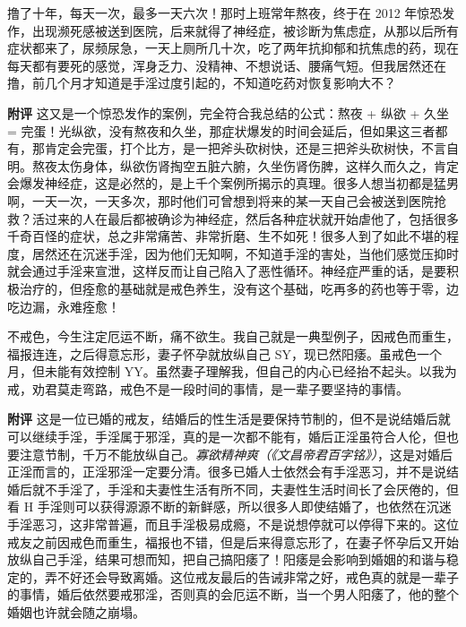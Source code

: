 \begin{case}
    撸了十年，每天一次，最多一天六次！那时上班常年熬夜，终于在 2012 年惊恐发作，出现濒死感被送到医院，后来就得了神经症，被诊断为焦虑症，从那以后所有症状都来了，尿频尿急，一天上厕所几十次，吃了两年抗抑郁和抗焦虑的药，现在每天都有要死的感觉，浑身乏力、没精神、不想说话、腰痛气短。但我居然还在撸，前几个月才知道是手淫过度引起的，不知道吃药对恢复影响大不？

    \textbf{附评} 这又是一个惊恐发作的案例，完全符合我总结的公式：熬夜 + 纵欲 + 久坐 = 完蛋！光纵欲，没有熬夜和久坐，那症状爆发的时间会延后，但如果这三者都有，那肯定会完蛋，打个比方，是一把斧头砍树快，还是三把斧头砍树快，不言自明。熬夜太伤身体，纵欲伤肾掏空五脏六腑，久坐伤肾伤脾，这样久而久之，肯定会爆发神经症，这是必然的，是上千个案例所揭示的真理。很多人想当初都是猛男啊，一天一次，一天多次，那时他们可曾想到将来的某一天自己会被送到医院抢救？活过来的人在最后都被确诊为神经症，然后各种症状就开始虐他了，包括很多千奇百怪的症状，总之非常痛苦、非常折磨、生不如死！很多人到了如此不堪的程度，居然还在沉迷手淫，因为他们无知啊，不知道手淫的害处，当他们感觉压抑时就会通过手淫来宣泄，这样反而让自己陷入了恶性循环。神经症严重的话，是要积极治疗的，但痊愈的基础就是戒色养生，没有这个基础，吃再多的药也等于零，边吃边漏，永难痊愈！
\end{case}

\begin{case}
    不戒色，今生注定厄运不断，痛不欲生。我自己就是一典型例子，因戒色而重生，福报连连，之后得意忘形，妻子怀孕就放纵自己 SY，现已然阳痿。虽戒色一个月，但未能有效控制 YY。虽然妻子理解我，但自己的内心已经抬不起头。以我为戒，劝君莫走弯路，戒色不是一段时间的事情，是一辈子要坚持的事情。

    \textbf{附评} 这是一位已婚的戒友，结婚后的性生活是要保持节制的，但不是说结婚后就可以继续手淫，手淫属于邪淫，真的是一次都不能有，婚后正淫虽符合人伦，但也要注意节制，千万不能放纵自己。\textit{寡欲精神爽（《文昌帝君百字铭》）}，这是对婚后正淫而言的，正淫邪淫一定要分清。很多已婚人士依然会有手淫恶习，并不是说结婚后就不手淫了，手淫和夫妻性生活有所不同，夫妻性生活时间长了会厌倦的，但看 H 手淫则可以获得源源不断的新鲜感，所以很多人即使结婚了，也依然在沉迷手淫恶习，这非常普遍，而且手淫极易成瘾，不是说想停就可以停得下来的。这位戒友之前因戒色而重生，福报也不错，但是后来得意忘形了，在妻子怀孕后又开始放纵自己手淫，结果可想而知，把自己搞阳痿了！阳痿是会影响到婚姻的和谐与稳定的，弄不好还会导致离婚。这位戒友最后的告诫非常之好，戒色真的就是一辈子的事情，婚后依然要戒邪淫，否则真的会厄运不断，当一个男人阳痿了，他的整个婚姻也许就会随之崩塌。
\end{case}

